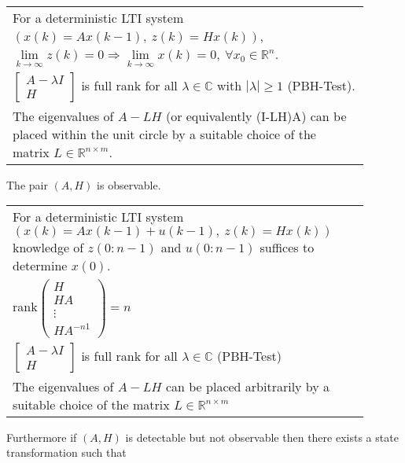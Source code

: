 \documentclass[10pt,a4paper]{scrartcl}
\begin{document}
\begin{multicols*}{2}
\begin{multicols*}{3}
\begin{tabular}{@{$\Leftrightarrow\ $}p{0.9\linewidth}}
For a deterministic LTI system $(x(k)=Ax(k-1),\ z(k)=Hx(k))$, $\lim\limits_{k\rightarrow\infty}z(k)=0\Rightarrow\lim\limits_{k\rightarrow\infty}x(k)=0,\ \forall x_0\in\mathbb{R}^n$.\\
$\begin{bmatrix}
A-\lambda I\\H
\end{bmatrix}$ is full rank for all $\lambda\in\mathbb{C}$ with $|\lambda|\geq 1$ (PBH-Test).\\
The eigenvalues of $A-LH$ (or equivalently (I-LH)A) can be placed within the unit circle by a suitable choice of the matrix $L\in\mathbb{R}^{n\times m}$.
\end{tabular}

\vspace{3ex}

The pair $(A,H)$ is observable.

\begin{tabular}{@{$\Leftrightarrow\ $}p{0.9\linewidth}}
For a deterministic LTI system $(x(k)=Ax(k-1)+u(k-1),\ z(k)=Hx(k))$ knowledge of $z(0:n-1)$ and $u(0:n-1)$ suffices to determine $x(0)$.\\
rank$\begin{pmatrix}
H\\HA\\\vdots\\HA^{-n1}
\end{pmatrix}=n$\\
$\begin{bmatrix}
A-\lambda I\\H
\end{bmatrix}$ is full rank for all $\lambda\in\mathbb{C}$ (PBH-Test)\\
The eigenvalues of $A-LH$ can be placed arbitrarily by a suitable choice of the matrix $L\in\mathbb{R}^{n\times m}$
\end{tabular}

Furthermore if $(A,H)$ is detectable but not observable then there exists a state transformation such that 



\end{multicols*}
\end{multicols*}
\end{document}
